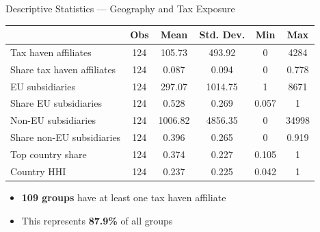 \documentclass[11pt,aspectratio=169]{beamer}
\begin{document}
  \begin{frame}{Descriptive Statistics --- Geography and Tax Exposure}
  
  \begin{center}
  \small
  \begin{tabular}{lccccc}
  \toprule
   & Obs & Mean & Std. Dev. & Min & Max \\
  \midrule
  Tax haven affiliates & 124 & 105.73 & 493.92 & 0 & 4284 \\
  Share tax haven affiliates & 124 & 0.087 & 0.094 & 0 & 0.778 \\
  EU subsidiaries & 124 & 297.07 & 1014.75 & 1 & 8671 \\
  Share EU subsidiaries & 124 & 0.528 & 0.269 & 0.057 & 1 \\
  Non-EU subsidiaries & 124 & 1006.82 & 4856.35 & 0 & 34998 \\
  Share non-EU subsidiaries & 124 & 0.396 & 0.265 & 0 & 0.919 \\
  Top country share & 124 & 0.374 & 0.227 & 0.105 & 1 \\
  Country HHI & 124 & 0.237 & 0.225 & 0.042 & 1 \\
  \bottomrule
  \end{tabular}
  \end{center}
  
  \medskip
  
  \begin{itemize}
      \item \textbf{109 groups} have at least one tax haven affiliate
      \item This represents \textbf{87.9\%} of all groups
  \end{itemize}
  
  \end{frame}
  
\end{document}
